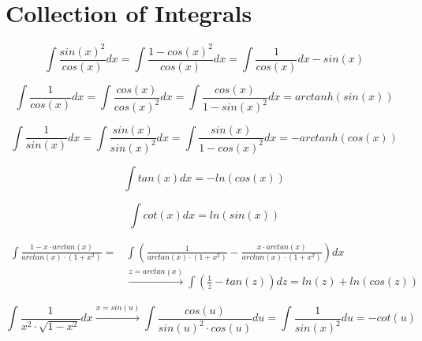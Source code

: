 \documentclass[./\jobname.tex]{subfiles}
\begin{document}
\chapter{Collection of Integrals}

\begin{equation*}
	\int \frac{sin(x)^2}{cos(x)} dx = \int \frac{1 - cos(x)^2}{cos(x)} dx = \int \frac{1}{cos(x)} dx - sin(x)
\end{equation*}

\noindent\makebox[\linewidth]{\rule{\paperwidth}{0.4pt}}

\begin{equation*}
\int \frac{1}{cos(x)} dx = \int \frac{cos(x)}{cos(x)^2} dx = \int \frac{cos(x)}{1 - sin(x)^2} dx = arctanh(sin(x))
\end{equation*}

\noindent\makebox[\linewidth]{\rule{\paperwidth}{0.4pt}}

\begin{equation*}
\int \frac{1}{sin(x)} dx = \int \frac{sin(x)}{sin(x)^2} dx = \int \frac{sin(x)}{1 - cos(x)^2} dx = -arctanh(cos(x))
\end{equation*}

\noindent\makebox[\linewidth]{\rule{\paperwidth}{0.4pt}}

\begin{equation*}
	\int tan(x) dx = -ln(cos(x))
\end{equation*}

\noindent\makebox[\linewidth]{\rule{\paperwidth}{0.4pt}}

\begin{equation*}
	\int cot(x) dx = ln(sin(x))
\end{equation*}

\noindent\makebox[\linewidth]{\rule{\paperwidth}{0.4pt}}

\begin{equation*}
	\begin{split}
	\int \frac{1-x \cdot arctan(x)}{arctan(x) \cdot (1 + x^2)} = & \int \left( \frac{1}{arctan(x) \cdot (1 + x^2)} - \frac{x \cdot arctan(x)}{arctan(x) \cdot (1 + x^2)} \right) dx \\
	& \xrightarrow{z = arctan(x)} \int \left( \frac{1}{z} - tan(z) \right) dz = ln(z) + ln(cos(z))
	\end{split}
\end{equation*}

\noindent\makebox[\linewidth]{\rule{\paperwidth}{0.4pt}}

\begin{equation*}
	\int \frac{1}{x^2 \cdot \sqrt{1 - x^2}} dx \xrightarrow{x = sin(u)} \int \frac{cos(u)}{sin(u)^2 \cdot cos(u)} du = \int \frac{1}{sin(x)^2} du = -cot(u)
\end{equation*}
\end{document}
